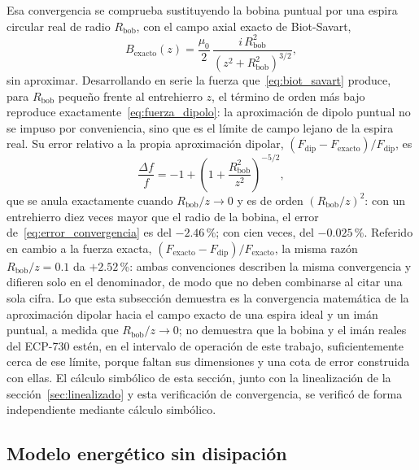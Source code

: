 Esa convergencia se comprueba sustituyendo la bobina puntual por una espira circular real de radio $R_{\text{bob}}$, con el campo axial exacto de Biot-Savart,
\begin{equation}
B_{\text{exacto}}(z) = \frac{\mu_0}{2}\,\frac{i\,R_{\text{bob}}^2}{\left(z^2+R_{\text{bob}}^2\right)^{3/2}} ,
\label{eq:biot_savart}
\end{equation}
sin aproximar. Desarrollando en serie la fuerza que~\eqref{eq:biot_savart} produce, para $R_{\text{bob}}$ pequeño frente al entrehierro $z$, el término de orden más bajo reproduce exactamente~\eqref{eq:fuerza_dipolo}: la aproximación de dipolo puntual no se impuso por conveniencia, sino que es el límite de campo lejano de la espira real. Su error relativo a la propia aproximación dipolar, $(F_{\text{dip}}-F_{\text{exacto}})/F_{\text{dip}}$, es
\begin{equation}
\frac{\Delta f}{f} = -1 + \left(1+\frac{R_{\text{bob}}^2}{z^2}\right)^{-5/2} ,
\label{eq:error_convergencia}
\end{equation}
que se anula exactamente cuando $R_{\text{bob}}/z\to0$ y es de orden $(R_{\text{bob}}/z)^2$: con un entrehierro diez veces mayor que el radio de la bobina, el error de~\eqref{eq:error_convergencia} es del $-2.46$\,\%; con cien veces, del $-0.025$\,\%. Referido en cambio a la fuerza exacta, $(F_{\text{exacto}}-F_{\text{dip}})/F_{\text{exacto}}$, la misma razón $R_{\text{bob}}/z=0.1$ da $+2.52$\,\%: ambas convenciones describen la misma convergencia y difieren solo en el denominador, de modo que no deben combinarse al citar una sola cifra. Lo que esta subsección demuestra es la convergencia matemática de la aproximación dipolar hacia el campo exacto de una espira ideal y un imán puntual, a medida que $R_{\text{bob}}/z\to0$; no demuestra que la bobina y el imán reales del ECP-730 estén, en el intervalo de operación de este trabajo, suficientemente cerca de ese límite, porque faltan sus dimensiones y una cota de error construida con ellas. El cálculo simbólico de esta sección, junto con la linealización de la sección~\ref{sec:linealizado} y esta verificación de convergencia, se verificó de forma independiente mediante cálculo simbólico.

\subsection{Modelo energético sin disipación}\label{sec:energia_primeros_principios}

